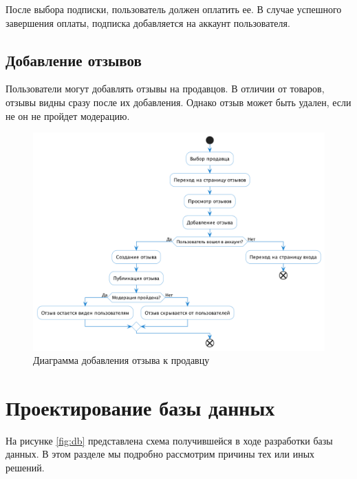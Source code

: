 \documentclass[a4paper,14pt]{extarticle}
\begin{document}
После выбора подписки, пользователь должен оплатить ее. В случае успешного завершения оплаты, подписка добавляется на аккаунт пользователя.

\subsection{Добавление отзывов}

Пользователи могут добавлять отзывы на продавцов. В отличии от товаров, отзывы видны сразу после их добавления. Однако отзыв может быть удален, если не он не пройдет модерацию.

\begin{figure}[H]
    \centering
    \includegraphics[width=\textwidth]{images/user_feedback.png}
    \caption{Диаграмма добавления отзыва к продавцу}
\end{figure}




\section{Проектирование базы данных}

На рисунке \ref{fig:db} представлена схема получившейся в ходе разработки базы данных. В этом разделе мы подробно рассмотрим причины тех или иных решений.
\end{document}

